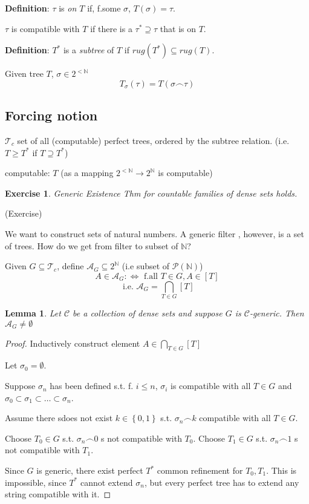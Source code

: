 \documentclass[12pt]{article}
\newcommand{\Nat}{\ensuremath{\mathbb{N}}}
\newcommand{\Pow}[1]{\ensuremath{\mathcal{P}(#1)}}
\newcommand{\defn}{\textbf{Definition}: }
\begin{document}
\defn $\tau$ is \emph{on $T$} if, f.some $\sigma$, $T(\sigma) = \tau$.

$\tau$ is compatible with $T$ if there is a 
$\tau^* \supseteq \tau$ that is on $T$.

\defn $T^*$ is a \emph{subtree} of $T$ if $rug(T^*) \subseteq rug(T)$.

Given tree $T$, $\sigma \in 2^{<\Nat}$
\[
 T_\sigma(\tau) = T(\sigma\frown\tau)
\]

\subsection{Forcing notion}
$\mathcal{T}_c$ set of all (computable) perfect trees, 
ordered by the subtree relation.
(i.e. $T \ge T^*$ if $T \supseteq T^*$)

computable: $T$ (as a mapping $2^{<\Nat} \rightarrow 2^{\Nat}$ is computable)

\newtheorem{genex}{Exercise} 
\begin{genex}
  Generic Existence Thm for countable families of dense sets holds.
\end{genex}
(Exercise)

We want to construct sets of natural numbers.
A generic filter , however, is a set of trees.
How do we get from filter to subset of $\Nat$?

Given $G \subseteq \mathcal{T}_c$, define $\mathcal{A}_G \subseteq 2^\Nat$ (i.e subset of $\Pow{\Nat}$)
\[
A \in \mathcal{A}_G: \Leftrightarrow \text{ f.all } T \in G, A \in [T]
\]
\[
\text{ i.e. }
\mathcal{A}_G = \bigcap_{T \in G} [T]
\]

\newtheorem{lem}{Lemma}
\begin{lem}
  Let $\mathcal{C}$ be a collection of dense sets 
  and suppose $G$ is $\mathcal{C}$-generic.
  Then $\mathcal{A}_G \ne \emptyset$
\end{lem}
\begin{proof}
  Inductively construct element $A \in \bigcap_{T \in G} [T]$

  Let $\sigma_0 = \emptyset$.

  Suppose $\sigma_n$ has been defined s.t. f. $i\le n$,
  $\sigma_i$ is compatible with all $T \in G$
  and $\sigma_0 \subset \sigma_1 \subset \dots \subset \sigma_n$.

  Assume there sdoes not exist $k \in \left\{0,1\right\}$ s.t.
  $\sigma_n \frown k$ compatible with all $T \in G$.

  Choose $T_0 \in G$ s.t. $\sigma_n \frown 0$ s not compatible with $T_0$.
  Choose $T_1 \in G$ s.t. $\sigma_n \frown 1$ s not compatible with $T_1$.

  Since $G$ is generic, there exist perfect $T^*$ common
  refinement for $T_0, T_1$.
  This is impossible, since $T^*$ cannot extend $\sigma_n$,
  but every perfect tree has to extend any string compatible with it.
\end{proof}
\end{document}
